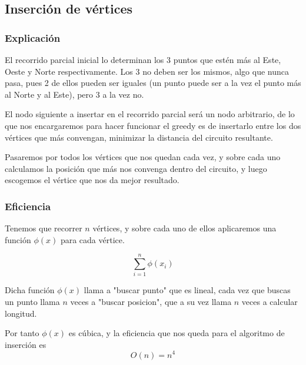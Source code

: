 \subsection{Inserción de vértices}
\subsubsection{Explicación}
\begin{frame}
	\begin{block}{ }
El recorrido parcial inicial lo determinan los 3 puntos que estén más al Este, Oeste y Norte respectivamente. Los 3 no deben ser los mismos, algo que nunca pasa, pues 2 de ellos pueden ser iguales (un punto puede ser a la vez el punto más al Norte y al Este), pero 3 a la vez no.
	\end{block}

	\begin{block}{ }
	El nodo siguiente a insertar en el recorrido parcial será un nodo arbitrario, de lo 
	que nos encargaremos para hacer funcionar el greedy es de insertarlo entre los dos 
	vértices que más convengan, minimizar la distancia del circuito resultante.

	Pasaremos por todos los vértices que nos quedan cada vez, y sobre cada uno calculamos 
	la posición que más nos convenga dentro del circuito, y luego escogemos el vértice que 
	nos da mejor resultado.
	\end{block}
\end{frame}

\subsubsection{Eficiencia}
\begin{frame}
	\begin{block}
	Tenemos que recorrer $n$ vértices, y sobre cada uno de ellos aplicaremos una función 		
	$\phi(x)$ para cada vértice.

	\[ \sum_{i=1}^{n} \phi(x_i)\]
	\end{block}
	\begin{block}
	Dicha función $\phi(x)$ llama a "buscar punto" que es lineal, cada vez que buscas un 
	punto llama $n$ veces a "buscar posicion", que a su vez llama $n$ veces a calcular 
	longitud.

	Por tanto $\phi(x)$ es cúbica, y la eficiencia que nos queda para el algoritmo de 
	inserción es
	\[ O(n) = n^4 \]
	\end{block}
\end{frame}

